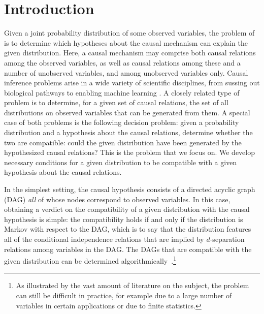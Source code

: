 \documentclass[aps,english,10pt,superscriptaddress,onecolumn,twoside,longbibliography,pra,floatfix,fleqn,nofootinbib]{revtex4-1}
\newcommand*{\tblue}[1]{{\color{MidnightBlue}{\textbf{#1}}}}
\theoremstyle{definition}
\newcounter{example}[section]
\begin{document}
\maketitle
\tableofcontents

\section{Introduction}

Given a joint probability distribution of some observed variables, the problem of \tblue{causal inference} is to determine which hypotheses about the causal mechanism can explain the given distribution. Here, a causal mechanism may comprise both causal relations among the observed variables, as well as causal relations among these and a number of unobserved variables, and among unobserved variables only. Causal inference problems arise in a wide variety of scientific disciplines, from sussing out biological pathways to enabling machine learning \cite{pearl2009causality,spirtes2011causation,studeny2005probabilistic,koller2009probabilistic}. A closely related type of problem is to determine, for a given set of causal relations, the set of all distributions on observed variables that can be generated from them.   
A special case of both problems is the following decision problem: given a probability distribution and a hypothesis about the causal relations, determine whether the two are compatible: could the given distribution have been generated by the hypothesized causal relations? This is the problem that we focus on.
We develop necessary conditions for a given distribution to be compatible with a given hypothesis about the causal relations.

In the simplest setting, the causal hypothesis consists of a directed acyclic graph (DAG) {\em all} of whose nodes correspond to observed variables. In this case, obtaining a verdict on the compatibility of a given distribution with the causal hypothesis is simple: the compatibility holds if and only if the distribution is Markov with respect to the DAG, which is to say that the distribution features all of the conditional independence relations that are implied by $d$-separation relations among variables in the DAG. The DAGs that are compatible with the given distribution can be determined algorithmically~\cite{pearl2009causality}.\footnote{As illustrated by the vast amount of literature on the subject, the problem can still be difficult in practice, for example due to a large number of variables in certain applications or due to finite statistics.}
\end{document}
